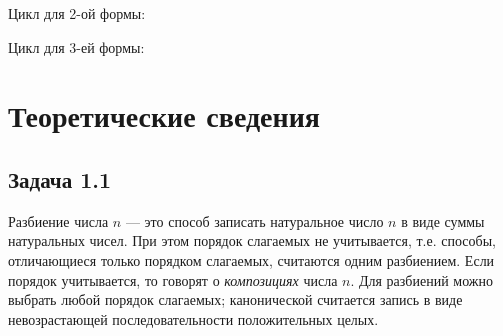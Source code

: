 Цикл для 2-ой формы:
\begin{figure}[H]
\end{figure}

Цикл для 3-ей формы:
\begin{figure}[H]
\end{figure}

\newpage

\section*{Теоретические сведения}

\subsection*{Задача 1.1}

Разбиение числа $n$ — это способ записать натуральное число $n$ в виде суммы натуральных чисел. При этом порядок слагаемых не учитывается, т.е. способы, отличающиеся только порядком слагаемых, считаются одним разбиением. Если порядок учитывается, то говорят о \textit{композициях} числа $n$. Для разбиений можно выбрать любой порядок слагаемых; канонической считается запись в виде невозрастающей последовательности положительных целых.

